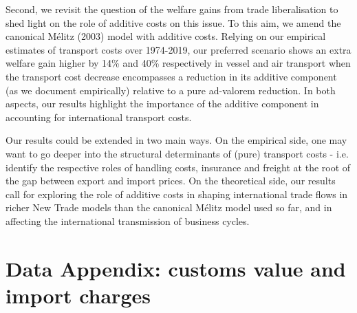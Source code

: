 \documentclass[a4paper,11pt]{article}
\begin{document}
Second, we revisit the question of the welfare gains from trade liberalisation to shed light on the role of additive costs on this issue. To this aim, we amend the canonical M\'{e}litz (2003) model with additive costs. Relying on our empirical estimates of transport
costs over 1974-2019, our preferred scenario shows an extra welfare gain higher by 14\% and 40\% respectively in vessel and air transport when the transport cost decrease encompasses a reduction in its additive
component (as we document empirically) relative to a pure ad-valorem reduction. In both aspects, our results highlight the importance of the additive component in accounting for international transport costs.

Our results could be extended in two main ways.
On the empirical side, one may want to go deeper into the structural determinants of (pure) transport costs - i.e.
identify the respective roles of handling costs, insurance and freight at the root of the gap between export and import prices.
On the theoretical side, our results call for exploring the role of additive costs in shaping international trade flows in richer New Trade models than the canonical M\'{e}litz model used so far, and in affecting the international transmission of business cycles.



\newpage




\newpage


\appendix

\clearpage

\setcounter{table}{0}
\renewcommand{\thefigure}{A.\arabic{figure}}
\renewcommand{\thetable}{A.\arabic{table}}


\section{Data Appendix: customs value and import charges\label{app:data}}
\end{document}
